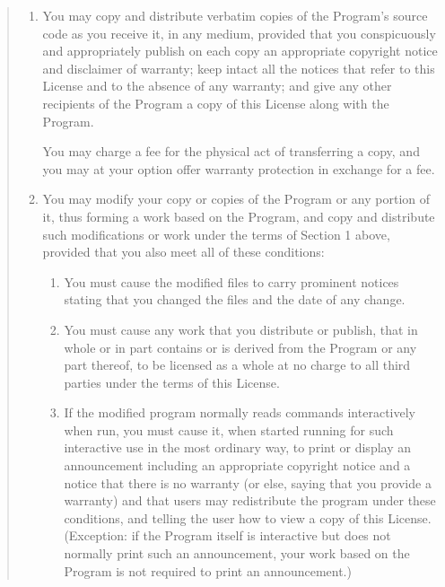 \documentclass[twoside,11pt]{article}
\renewcommand{\_}{\texttt{\symbol{95}}}
\begin{document}
\begin{quote}
\begin{enumerate}
\item You may copy and distribute verbatim copies of the Program's source
  code as you receive it, in any medium, provided that you conspicuously
  and appropriately publish on each copy an appropriate copyright notice
  and disclaimer of warranty; keep intact all the notices that refer to
  this License and to the absence of any warranty; and give any other
  recipients of the Program a copy of this License along with the Program.

You may charge a fee for the physical act of transferring a copy, and you
may at your option offer warranty protection in exchange for a fee.

\item

You may modify your copy or copies of the Program or any portion
of it, thus forming a work based on the Program, and copy and
distribute such modifications or work under the terms of Section 1
above, provided that you also meet all of these conditions:

\begin{enumerate}

\item

You must cause the modified files to carry prominent notices stating that
you changed the files and the date of any change.

\item

You must cause any work that you distribute or publish, that in
whole or in part contains or is derived from the Program or any
part thereof, to be licensed as a whole at no charge to all third
parties under the terms of this License.

\item
If the modified program normally reads commands interactively
when run, you must cause it, when started running for such
interactive use in the most ordinary way, to print or display an
announcement including an appropriate copyright notice and a
notice that there is no warranty (or else, saying that you provide
a warranty) and that users may redistribute the program under
these conditions, and telling the user how to view a copy of this
License.  (Exception: if the Program itself is interactive but
does not normally print such an announcement, your work based on
the Program is not required to print an announcement.)

\end{enumerate}



\end{enumerate}
\end{quote}
\end{document}
